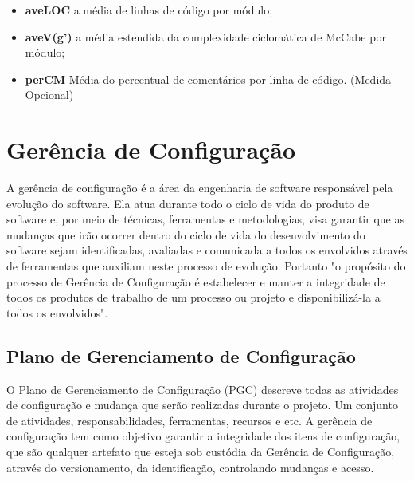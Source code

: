 \begin{itemize}
\item \textbf{aveLOC} a média de linhas de código por módulo;
\end{itemize}
\begin{itemize}
\item \textbf{aveV(g')} a média estendida da complexidade ciclomática de McCabe por módulo;
\end{itemize}

\begin{itemize}
\item \textbf{perCM} Média do percentual de comentários por linha de código. (Medida Opcional)
\end{itemize}


\section{Gerência de Configuração}\label{gerenciadeconfiguracao}
A gerência de configuração é a área da engenharia de software responsável pela evolução do software. Ela atua durante todo o ciclo de vida do produto de software e, por meio de técnicas, ferramentas e metodologias, visa garantir que as mudanças que irão ocorrer dentro do ciclo de vida do desenvolvimento do software sejam identificadas, avaliadas e comunicada a todos os envolvidos através de ferramentas que auxiliam neste processo de evolução.
Portanto "o propósito do processo de Gerência de Configuração é estabelecer e manter a integridade de todos os produtos de trabalho de um processo ou projeto e disponibilizá-la a todos os envolvidos"\space\cite{mpsbr}.
\subsection{Plano de Gerenciamento de Configuração}
O Plano de Gerenciamento de Configuração (PGC) descreve todas as atividades de configuração e mudança que serão realizadas durante o projeto. Um conjunto de atividades, responsabilidades, ferramentas, recursos e etc. A gerência de configuração tem como objetivo garantir a integridade dos itens de configuração, que são qualquer artefato que esteja sob custódia da Gerência de Configuração, através do versionamento, da identificação, controlando mudanças e acesso. 

